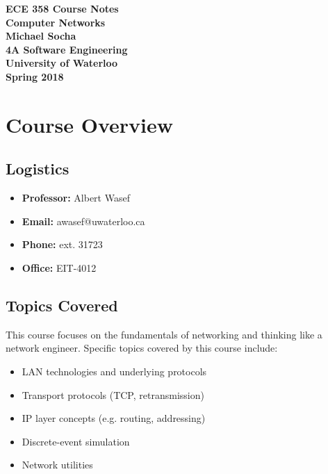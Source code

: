 \documentclass[12pt,titlepage]{article}
\begin{document}
  \begin{titlepage}
    \vspace*{\fill}
    \centering

    \textbf{\Huge ECE 358 Course Notes} \\ [0.4em]
    \textbf{\Large Computer Networks} \\ [1em]
    \textbf{\Large Michael Socha} \\ [1em]
    \textbf{\large 4A Software Engineering} \\
    \textbf{\large University of Waterloo} \\
    \textbf{\large Spring 2018} \\
    \vspace*{\fill}
  \end{titlepage}

  \newpage 

  \tableofcontents

  \newpage

  \section{Course Overview}
    \subsection{Logistics}
      \begin{itemize}
        \item \textbf{Professor:} Albert Wasef
        \item \textbf{Email:} awasef@uwaterloo.ca
        \item \textbf{Phone:} ext. 31723
        \item \textbf{Office:} EIT-4012
      \end{itemize}

    \subsection{Topics Covered}
      This course focuses on the fundamentals of networking and thinking like a network engineer.
      Specific topics covered by this course include:
      \begin{itemize}
        \item LAN technologies and underlying protocols
        \item Transport protocols (TCP, retransmission)
        \item IP layer concepts (e.g. routing, addressing)
        \item Discrete-event simulation
        \item Network utilities
      \end{itemize}
\end{document}
